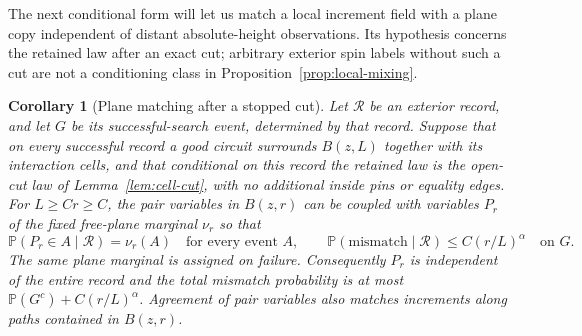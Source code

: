 \documentclass[11pt]{article}
\newcommand{\Prob}{\mathbb P}
\newtheorem{corollary}[theorem]{Corollary}
\theoremstyle{definition}
\theoremstyle{remark}
\numberwithin{equation}{section}
\begin{document}
The next conditional form will let us match a local increment field with
a plane copy independent of distant absolute-height observations.  Its
hypothesis concerns the retained law after an exact cut; arbitrary exterior
spin labels without such a cut are not a conditioning class in
Proposition~\ref{prop:local-mixing}.

\begin{corollary}[Plane matching after a stopped cut]
\label{cor:conditional-plane-matching}
Let $\mathcal R$ be an exterior record, and let $G$ be its
successful-search event, determined by that record.  Suppose that on every successful record a good
circuit surrounds $B(z,L)$ together with its interaction cells, and that
conditional on this record the retained law is the open-cut law of
Lemma~\ref{lem:cell-cut}, with no additional inside pins or equality edges.
For $L\ge Cr\ge C$, the pair variables in $B(z,r)$ can be coupled with
variables $P_r$ of the fixed free-plane marginal $\nu_r$ so that
\[
 \Prob(P_r\in A\mid\mathcal R)=\nu_r(A)
 \quad\text{for every event }A,
 \qquad
 \Prob(\text{mismatch}\mid\mathcal R)\le C(r/L)^\alpha
 \quad\text{on }G.
\]
The same plane marginal is assigned on failure.  Consequently $P_r$ is
independent of the entire record and the total mismatch probability is at
most $\Prob(G^c)+C(r/L)^\alpha$.  Agreement of pair variables also matches
increments along paths contained in $B(z,r)$.
\end{corollary}
\end{document}
